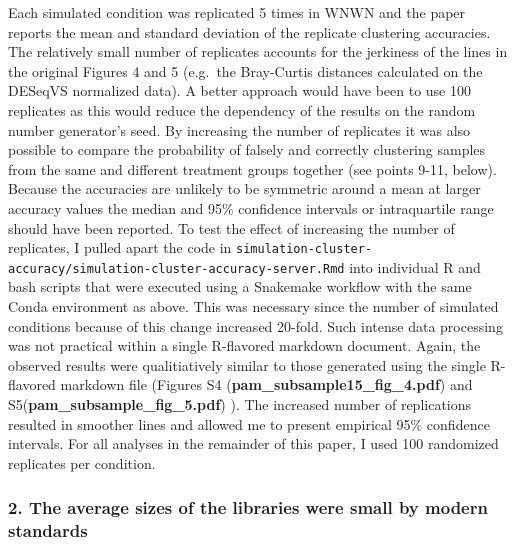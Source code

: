 \documentclass[
]{article}
\begin{document}
Each simulated condition was replicated 5 times in WNWN and the paper
reports the mean and standard deviation of the replicate clustering
accuracies. The relatively small number of replicates accounts for the
jerkiness of the lines in the original Figures 4 and 5 (e.g.~the
Bray-Curtis distances calculated on the DESeqVS normalized data). A
better approach would have been to use 100 replicates as this would
reduce the dependency of the results on the random number generator's
seed. By increasing the number of replicates it was also possible to
compare the probability of falsely and correctly clustering samples from
the same and different treatment groups together (see points 9-11,
below). Because the accuracies are unlikely to be symmetric around a
mean at larger accuracy values the median and 95\% confidence intervals
or intraquartile range should have been reported. To test the effect of
increasing the number of replicates, I pulled apart the code in
\texttt{simulation-cluster-accuracy/simulation-cluster-accuracy-server.Rmd}
into individual R and bash scripts that were executed using a Snakemake
workflow with the same Conda environment as above. This was necessary
since the number of simulated conditions because of this change
increased 20-fold. Such intense data processing was not practical within
a single R-flavored markdown document. Again, the observed results were
qualitiatively similar to those generated using the single R-flavored
markdown file (Figures S4 (\textbf{pam\_subsample15\_fig\_4.pdf}) and
S5(\textbf{pam\_subsample\_fig\_5.pdf}) ). The increased number of
replications resulted in smoother lines and allowed me to present
empirical 95\% confidence intervals. For all analyses in the remainder
of this paper, I used 100 randomized replicates per condition.

\hypertarget{the-average-sizes-of-the-libraries-were-small-by-modern-standards}{%
\subsubsection{2. The average sizes of the libraries were small by
modern
standards}\label{the-average-sizes-of-the-libraries-were-small-by-modern-standards}}
\end{document}
